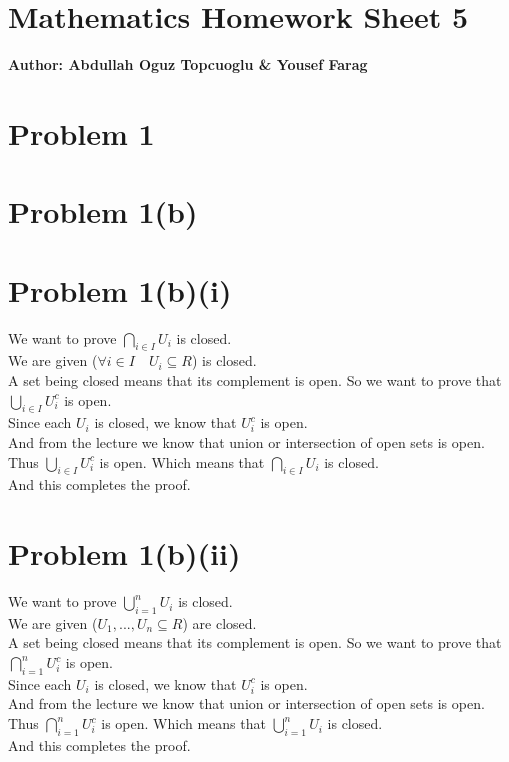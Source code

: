 \documentclass{article}
\begin{document}
\section*{\huge Mathematics Homework Sheet 5}
\begin{flushright}
   \textbf{Author: Abdullah Oguz Topcuoglu \& Yousef Farag}
\end{flushright}

\section*{Problem 1}

\section*{Problem 1(b)}
\section*{Problem 1(b)(i)}
We want to prove \(\bigcap_{i \in I} U_i\) is closed.\\
We are given (\(\forall i \in I \quad U_i \subseteq R\)) is closed. \\
A set being closed means that its complement is open. So we want to prove that \(\bigcup_{i \in I} U_i^c\) is open.\\
Since each \(U_i\) is closed, we know that \(U_i^c\) is open.\\
And from the lecture we know that union or intersection of open sets is open. Thus \(\bigcup_{i \in I} U_i^c\) is open. Which means that \(\bigcap_{i \in I} U_i\) is closed.\\
And this completes the proof.\\

\section*{Problem 1(b)(ii)}
We want to prove \(\bigcup_{i = 1}^n U_i\) is closed.\\
We are given (\(U_1,...,U_n \subseteq R\)) are closed. \\
A set being closed means that its complement is open. So we want to prove that \(\bigcap_{i = 1}^n U_i^c\) is open.\\
Since each \(U_i\) is closed, we know that \(U_i^c\) is open.\\
And from the lecture we know that union or intersection of open sets is open. Thus \(\bigcap_{i = 1}^n U_i^c\) is open. Which means that \(\bigcup_{i = 1}^n U_i\) is closed.\\
And this completes the proof.\\
\end{document}

